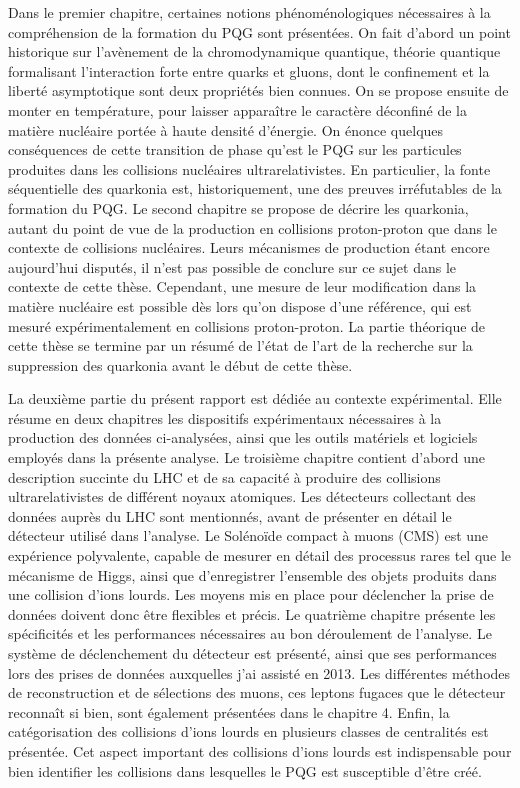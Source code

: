 Dans le premier chapitre, certaines notions phénoménologiques nécessaires à la
compréhension de la formation du PQG sont présentées. On fait d'abord
un point historique sur l'avènement de la chromodynamique quantique,
théorie quantique formalisant l'interaction forte entre quarks et
gluons, dont le confinement et la liberté asymptotique sont deux
propriétés bien connues. On se propose ensuite de monter en
température, pour laisser apparaître le caractère déconfiné de la
matière nucléaire portée à haute densité d'énergie. On énonce quelques
conséquences de cette transition de phase qu'est le PQG sur les particules produites
dans les collisions nucléaires ultrarelativistes. En particulier, la
fonte séquentielle des quarkonia est, historiquement, une des preuves
irréfutables de la formation du PQG. Le second chapitre se propose de
décrire les quarkonia, autant du point de vue de la
production en collisions proton-proton que dans le contexte de
collisions nucléaires. Leurs mécanismes de production étant encore
aujourd'hui disputés, il n'est pas possible de conclure sur ce
sujet dans le contexte de cette thèse. Cependant, une mesure de leur
modification dans la matière nucléaire est possible dès lors qu'on
dispose d'une référence, qui est mesuré expérimentalement en
collisions proton-proton. La partie théorique de cette thèse se
termine par un résumé de l'état de l'art de la recherche sur la
suppression des quarkonia avant le début de cette thèse.

La deuxième partie du présent rapport est dédiée au contexte
expérimental. Elle résume en deux chapitres les dispositifs
expérimentaux nécessaires à la production des données ci-analysées,
ainsi que les outils matériels et logiciels employés dans la présente
analyse. Le troisième chapitre contient d'abord une description succinte du LHC et
de sa capacité à produire des collisions ultrarelativistes de
différent noyaux atomiques. Les détecteurs collectant des données auprès
du LHC sont mentionnés, avant de présenter en détail le détecteur
utilisé dans l'analyse. Le Solénoïde compact à muons (CMS) est une
expérience polyvalente, capable de mesurer en détail des processus
rares tel que le mécanisme de Higgs, ainsi que d'enregistrer
l'ensemble des objets produits dans une collision d'ions lourds. Les
moyens mis en place pour déclencher la prise de données doivent donc
être flexibles et précis. 
Le quatrième chapitre présente les spécificités et les performances
nécessaires au bon déroulement de l'analyse. Le système de
déclenchement du détecteur est présenté, ainsi que ses performances
lors des prises de données auxquelles j'ai assisté en
2013. Les différentes méthodes de reconstruction et de sélections des muons, ces leptons fugaces que le détecteur reconnaît si
bien, sont également présentées dans le chapitre 4. Enfin, la
catégorisation des collisions d'ions lourds en plusieurs classes de
centralités est présentée. Cet aspect important des collisions d'ions
lourds est indispensable pour bien identifier les collisions dans
lesquelles le PQG est susceptible d'être créé.

